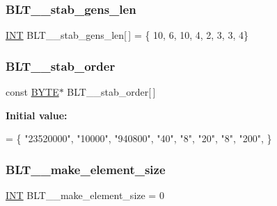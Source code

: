 \subsubsection{\texorpdfstring{B\+L\+T\+\_\+\_\+stab\+\_\+gens\+\_\+len}{BLT\_49\_stab\_gens\_len}}
{\footnotesize\ttfamily \mbox{\hyperlink{galois_8h_a09fddde158a3a20bd2dcadb609de11dc}{I\+NT}} B\+L\+T\+\_\+\_\+stab\+\_\+gens\+\_\+len\mbox{[}$\,$\mbox{]} = \{ 10, 6, 10, 4, 2, 3, 3, 4\}}

\mbox{\label{data___b_l_t_8_c_a96c84f25960409b8d61a1f90338d3c4b}} 
\subsubsection{\texorpdfstring{B\+L\+T\+\_\+\_\+stab\+\_\+order}{BLT\_49\_stab\_order}}
{\footnotesize\ttfamily const \mbox{\hyperlink{galois_8h_ab6cc7b4aeb6ea31aba2b3fbfc83ff5e6}{B\+Y\+TE}}$\ast$ B\+L\+T\+\_\+\_\+stab\+\_\+order\mbox{[}$\,$\mbox{]}}

{\bfseries Initial value\+:}
\begin{DoxyCode}
= \{
\textcolor{stringliteral}{"23520000"},
\textcolor{stringliteral}{"10000"},
\textcolor{stringliteral}{"940800"},
\textcolor{stringliteral}{"40"},
\textcolor{stringliteral}{"8"},
\textcolor{stringliteral}{"20"},
\textcolor{stringliteral}{"8"},
\textcolor{stringliteral}{"200"},
\}
\end{DoxyCode}
\mbox{\label{data___b_l_t_8_c_a37bac37c653b056b3c5be7c607b8f580}} 
\subsubsection{\texorpdfstring{B\+L\+T\+\_\+\_\+make\+\_\+element\+\_\+size}{BLT\_53\_make\_element\_size}}
{\footnotesize\ttfamily \mbox{\hyperlink{galois_8h_a09fddde158a3a20bd2dcadb609de11dc}{I\+NT}} B\+L\+T\+\_\+\_\+make\+\_\+element\+\_\+size = 0}

